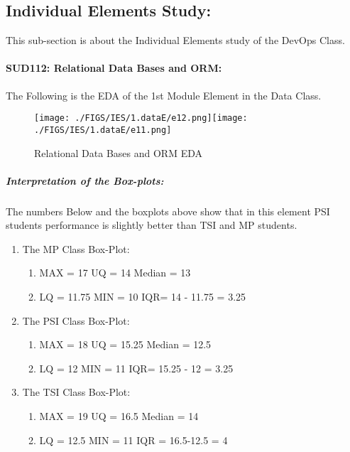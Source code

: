 \documentclass[12pt]{extreport}
\begin{document}
\subsection{Individual Elements Study:}
This sub-section is about the Individual Elements study of the DevOps Class. 


\paragraph{\large SUD112: Relational Data Bases and ORM:\\
} 
The Following is the EDA of the 1st Module Element in the Data Class.

\begin{figure}[H]
	\centering
	\texttt{[image: ./FIGS/IES/1.dataE/e12.png]}\texttt{[image: ./FIGS/IES/1.dataE/e11.png]}
	\caption{Relational Data Bases and ORM EDA}
	\label{fig:6}
\end{figure}


\subparagraph{Interpretation of the Box-plots:\\
}
The numbers Below and the boxplots above show that in this element  PSI students performance is slightly better than TSI and MP students.
\begin{enumerate}
	\item The MP Class Box-Plot:
	\begin{enumerate}
		\item MAX = 17  {} {} {} {} {} {} {} {}  UQ = 14  {} {} {} {} {} {} {} Median = 13					
		\item LQ = 11.75  {} {} {} {} {} {} {} MIN = 10  {} {} {} {} {} {} {} IQR= 14 - 11.75 = 3.25
	\end{enumerate}
	\item The PSI Class Box-Plot:
	\begin{enumerate}
		\item MAX = 18 {} {} {} {} {} {} {} {} UQ = 15.25 {} {} {} {} {} {} {} {} Median = 12.5				
		\item LQ = 12 {} {} {} {} {} {} {} {} MIN =	11 {} {} {} {} {} {} {} {} IQR= 15.25 - 12 = 3.25
	\end{enumerate}
	\item The TSI Class Box-Plot:
	\begin{enumerate}
		\item MAX = 19 {} {} {} {} {} {} {} {} UQ = 16.5 {} {} {} {} {} {} {} {} Median = 14 
		\item LQ = 12.5 {} {} {} {} {} {} {} {}	MIN = 11{} {} {} {} {} {} {} {} IQR = 16.5-12.5 = 4 	
	\end{enumerate}
\end{enumerate}
\end{document}
